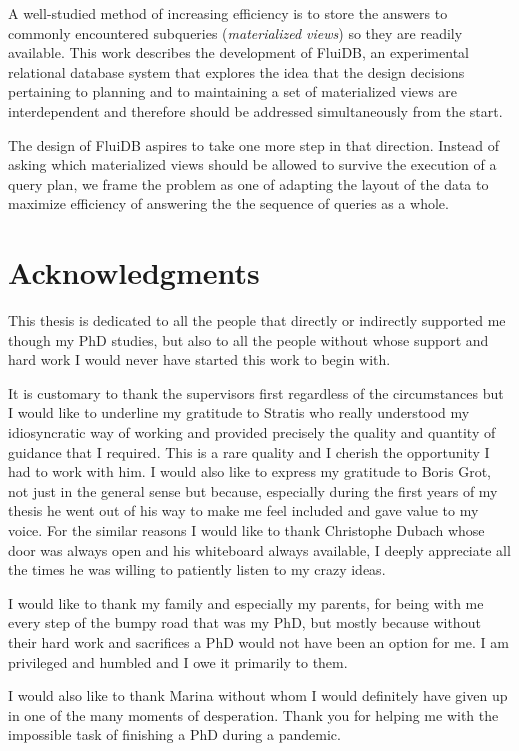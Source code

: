 \begin{precontent}
A well-studied method of increasing efficiency is to store the answers to commonly encountered subqueries (\emph{materialized views}) so they are readily available. This work describes the development of FluiDB, an experimental relational database system that explores the idea that the design decisions pertaining to planning and to maintaining a set of materialized views are interdependent and therefore should be addressed simultaneously from the start.

The design of FluiDB aspires to take one more step in that direction. Instead of asking which materialized views should be allowed to survive the execution of a query plan, we frame the problem as one of adapting the layout of the data to maximize efficiency of answering the the sequence of queries as a whole.

\chapter{Acknowledgments}%

This thesis is dedicated to all the people that directly or indirectly
supported me though my PhD studies, but also to all the people
without whose support and hard work I would never have started this
work to begin with.

It is customary to thank the supervisors first regardless of the
circumstances but I would like to underline my gratitude to Stratis
who really understood my idiosyncratic way of working and provided
precisely the quality and quantity of guidance that I required. This
is a rare quality and I cherish the opportunity I had to work with
him. I would also like to express my gratitude to Boris Grot, not just
in the general sense but because, especially during the first years of
my thesis he went out of his way to make me feel included and gave
value to my voice. For the similar reasons I would like to thank
Christophe Dubach whose door was always open and his whiteboard always
available, I deeply appreciate all the times he was willing to
patiently listen to my crazy ideas.

I would like to thank my family and especially my parents, for being
with me every step of the bumpy road that was my PhD, but mostly
because without their hard work and sacrifices a PhD would not have
been an option for me. I am privileged and humbled and I owe it
primarily to them.

I would also like to thank Marina without whom I would definitely have
given up in one of the many moments of desperation. Thank you for
helping me with the impossible task of finishing a PhD during a
pandemic.


\end{precontent}
